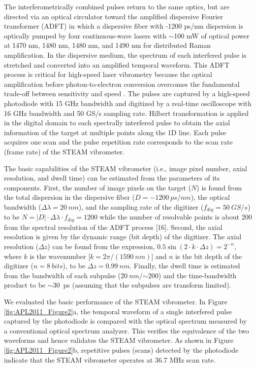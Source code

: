 The interferometrically combined pulses return to the same optics, but are directed via an optical circulator toward the amplified dispersive Fourier transformer (ADFT) \cite{goda2009serial, goda2008amplified, goda2009theory} in which a dispersive fiber with -1200 ps/nm dispersion is optically pumped by four continuous-wave lasers with $\sim$100 mW of optical power at 1470 nm, 1480 nm, 1480 nm, and 1490 nm for distributed Raman amplification. In the dispersive medium, the spectrum of each interfered pulse is stretched and converted into an amplified temporal waveform. This ADFT process is critical for high-speed laser vibrometry because the optical amplification before photon-to-electron conversion overcomes the fundamental trade-off between sensitivity and speed \cite{goda2009serial, goda2009theory}. The pulses are captured by a high-speed photodiode with 15 GHz bandwidth and digitized by a real-time oscilloscope with 16 GHz bandwidth and 50 GS/s sampling rate. Hilbert transformation is applied in the digital domain to each spectrally interfered pulse to obtain the axial information of the target at multiple points along the 1D line. Each pulse acquires one scan and the pulse repetition rate corresponds to the scan rate (frame rate) of the STEAM vibrometer.

The basic capabilities of the STEAM vibrometer (i.e., image pixel number, axial resolution, and dwell time) can be estimated from the parameters of its components. First, the number of image pixels on the target ($ N $) is found from the total dispersion in the dispersive fiber ($ D = \SI{-1200}{ps/nm} $), the optical bandwidth ($ \Delta\lambda = \SI{20}{nm} $), and the sampling rate of the digitizer ($ f_{dig} = \SI{50}{GS/s} $) to be $ N = |D| \cdot \Delta\lambda \cdot f_{dig} = 1200 $ while the number of resolvable points is about 200 from the spectral resolution of the ADFT process [16]. Second, the axial resolution is given by the dynamic range (bit depth) of the digitizer. The axial resolution ($\Delta z$) can be found from the expression, $0.5 \sin(2 \cdot k \cdot \Delta z) = 2^{-n}$, where $k$ is the wavenumber [$k = 2 \pi / (\SI{1590}{nm})$] and $n$ is the bit depth of the digitizer ($n = \SI{8}{bits}$), to be $\Delta z = \SI{0.99}{nm}$. Finally, the dwell time is estimated from the bandwidth of each subpulse ($\SI{20}{nm} /$$\sim$$\num{200}$) and the time-bandwidth product to be $\sim$\SI{30}{ps} (assuming that the subpulses are transform limited).

We evaluated the basic performance of the STEAM vibrometer. In Figure \ref{fig:APL2011_Figure2}a, the temporal waveform of a single interfered pulse captured by the photodiode is compared with the optical spectrum measured by a conventional optical spectrum analyzer. This verifies the equivalence of the two waveforms and hence validates the STEAM vibrometer. As shown in Figure \ref{fig:APL2011_Figure2}b, repetitive pulses (scans) detected by the photodiode indicate that the STEAM vibrometer operates at 36.7 MHz scan rate.

